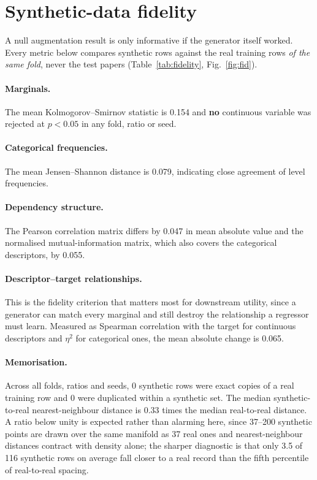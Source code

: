 \section{Synthetic-data fidelity}\label{sec:fidelity}

A null augmentation result is only informative if the generator itself worked. Every metric
below compares synthetic rows against the real training rows \emph{of the same fold}, never
the test papers (Table~\ref{tab:fidelity}, Fig.~\ref{fig:fid}).

\paragraph{Marginals.} The mean Kolmogorov--Smirnov statistic is
0.154 and \textbf{no} continuous variable was rejected at
$p<0.05$ in any fold, ratio or seed.

\paragraph{Categorical frequencies.} The mean Jensen--Shannon distance is
0.079, indicating close agreement of level frequencies.

\paragraph{Dependency structure.} The Pearson correlation matrix differs by
0.047 in mean absolute value and the normalised
mutual-information matrix, which also covers the categorical descriptors, by
0.055.

\paragraph{Descriptor--target relationships.} This is the fidelity criterion that matters
most for downstream utility, since a generator can match every marginal and still destroy the
relationship a regressor must learn. Measured as Spearman correlation with the target for
continuous descriptors and $\eta^2$ for categorical ones, the mean absolute change is
0.065.

\paragraph{Memorisation.} Across all folds, ratios and seeds,
0 synthetic rows were exact copies of a real
training row and 0 were duplicated within a
synthetic set. The median synthetic-to-real nearest-neighbour distance is
0.33 times the median
real-to-real distance. A ratio below unity is expected rather than alarming here, since
37--200 synthetic points are drawn
over the same manifold as 37 real ones and
nearest-neighbour distances contract with density alone; the sharper diagnostic is that only
3.5 of
116 synthetic rows on average fall closer to a real record than
the fifth percentile of real-to-real spacing.

